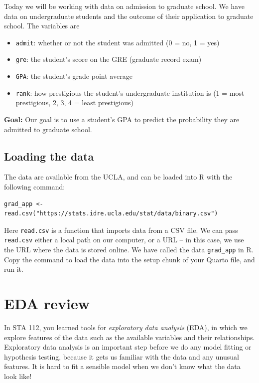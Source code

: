 \documentclass[11pt]{article}
\begin{document}
Today we will be working with data on admission to graduate school. We have data on undergraduate students and the outcome of their application to graduate school. The variables are

\begin{itemize}
\item \texttt{admit}: whether or not the student was admitted (0 = no, 1 = yes)
\item \texttt{gre}: the student's score on the GRE (graduate record exam)
\item \texttt{GPA}: the student's grade point average
\item \texttt{rank}: how prestigious the student's undergraduate institution is (1 = most prestigious, 2, 3, 4 = least prestigious)
\end{itemize}

\noindent \textbf{Goal:} Our goal is to use a student's GPA to predict the probability they are admitted to graduate school.

\subsection*{Loading the data}

The data are available from the UCLA, and can be loaded into R with the following command:

\begin{verbatim}
grad_app <- read.csv("https://stats.idre.ucla.edu/stat/data/binary.csv")
\end{verbatim}

\noindent Here \texttt{read.csv} is a function that imports data from a CSV file. We can pass \texttt{read.csv} either a local path on our computer, or a URL -- in this case, we use the URL where the data is stored online. We have called the data \verb;grad_app; in R.\\

\noindent Copy the command to load the data into the setup chunk of your Quarto file, and run it.


\section{EDA review}

In STA 112, you learned tools for \textit{exploratory data analysis} (EDA), in which we explore features of the data such as the available variables and their relationships. Exploratory data analysis is an important step before we do any model fitting or hypothesis testing, because it gets us familiar with the data and any unusual features. It is hard to fit a sensible model when we don't know what the data look like!\\
\end{document}
